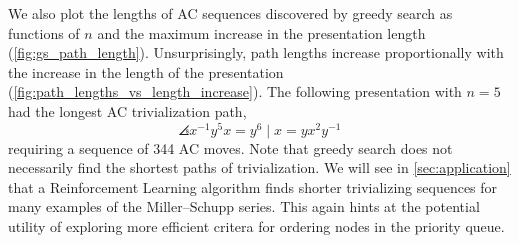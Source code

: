 We also plot the lengths of AC sequences discovered by greedy search as functions of $n$ and the maximum increase in the presentation length (\autoref{fig:gs_path_length}).
Unsurprisingly, path lengths increase proportionally with the increase in the length of the presentation (\autoref{fig:path_lengths_vs_length_increase}).
The following presentation with $n=5$ had the longest AC trivialization path,
\[
\angles{x^{-1} y^5 x = y^6 \mid  x = y x^2 y^{-1}}
\]
requiring a sequence of 344 AC moves.
Note that greedy search does not necessarily find the shortest paths of trivialization.
We will see in \autoref{sec:application} that a Reinforcement Learning algorithm finds shorter trivializing sequences for many examples of the Miller--Schupp series.
This again hints at the potential utility of exploring more efficient critera for ordering nodes in the priority queue.

